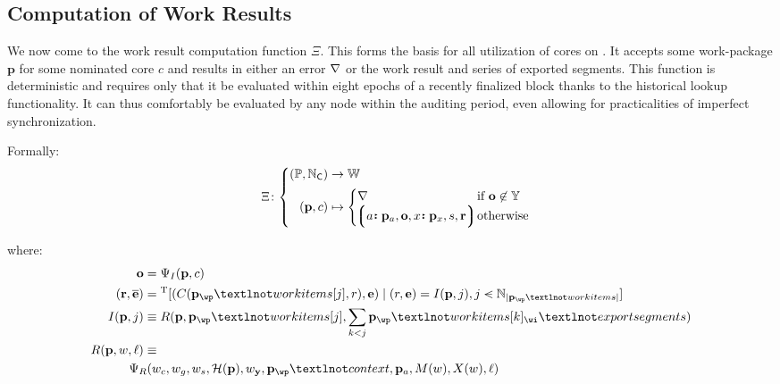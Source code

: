 \subsection{Computation of Work Results}\label{sec:computeworkresult}

We now come to the work result computation function $\Xi$. This forms the basis for all utilization of cores on \Jam. It accepts some work-package $\mathbf{p}$ for some nominated core $c$ and results in either an error $\nabla$ or the work result and series of exported segments. This function is deterministic and requires only that it be evaluated within eight epochs of a recently finalized block thanks to the historical lookup functionality. It can thus comfortably be evaluated by any node within the auditing period, even allowing for practicalities of imperfect synchronization.

Formally:
\begin{equation}\label{eq:workresultfunction}
  \!\!\Xi \colon \left\{\begin{aligned}
    (\mathbb{P}, \N_\mathsf{C}) &\to \mathbb{W} \\
    (\mathbf{p}, c) &\mapsto \begin{cases}
        \error &\when \mathbf{o} \not\in \Y \\
        \tup{\is{a}{\mathbf{p}_a}, \mathbf{o}, \is{x}{\mathbf{p}_x}, s, \mathbf{r}} \!\!\!\!\!&\otherwise
    \end{cases}
  \end{aligned}\right.\!\!\!\!\!\!\!
\end{equation}

where:
\begin{align*}
  \mathbf{o} &= \Psi_I(\mathbf{p}, c) \\
  (\mathbf{r}, \overline{\mathbf{e}}) &= \transpose[
    (\itemtoresult(\mathbf{p}_\wp¬workitems[j], r), \mathbf{e})
    \mid
    (r, \mathbf{e}) = \countupexports(\mathbf{p}, j),
    j \orderedin \N_{|\mathbf{p}_\wp¬workitems|}
  ] \\
  \countupexports(\mathbf{p}, j) &\equiv \marshallrefine(
    \mathbf{p},
    \mathbf{p}_\wp¬workitems[j],
    \sum_{k < j}\mathbf{p}_\wp¬workitems[k]_\wi¬exportsegments
  )\\
  \marshallrefine(\mathbf{p}, w, \ell) &\equiv \\
  &\!\!\!\!\!\!\!\Psi_R(
    w_c,
    w_g,
    w_s,
    \mathcal{H}(\mathbf{p}),
    w_\mathbf{y},
    \mathbf{p}_\wp¬context,
    \mathbf{p}_a,
    \importsegmentdata(w),
    \extrinsicdata(w),
    \ell
  )
\end{align*}

